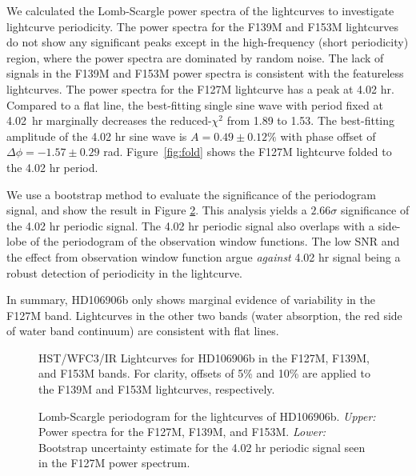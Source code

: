\documentclass[twocolumn]{aastex62}
\begin{document}
We calculated the Lomb-Scargle power spectra \citep[][Figure~\ref{fig:periodogram}]{Lomb1976} of the lightcurves to investigate lightcurve periodicity. The power spectra for the F139M and F153M lightcurves do not show any significant peaks except in the high-frequency (short periodicity) region, where the power spectra are dominated by random noise. The lack of signals in the F139M and F153M power spectra is consistent with the featureless lightcurves. The power spectra for the F127M lightcurve has a peak at 4.02 hr. Compared to a flat line, the best-fitting single sine wave with period fixed at 4.02~hr marginally decreases the reduced-$\chi^{2}$ from 1.89 to 1.53. The best-fitting amplitude of the 4.02 hr sine wave is $A = 0.49\pm0.12\%$ with phase offset of $\Delta \phi = -1.57\pm0.29$ rad. Figure~\ref{fig:fold} shows the F127M lightcurve folded to the 4.02 hr period.

We use a bootstrap method \citep{Manjavacas2017,Zhou2019} to evaluate the significance of the periodogram signal, and show the result in Figure \ref{fig:periodogram}. This analysis yields a $2.66\sigma$ significance of the 4.02 hr periodic signal. The 4.02 hr periodic signal also overlaps with a side-lobe of the periodogram of the observation window functions. The low SNR and the effect from observation window function argue \emph{against} 4.02 hr signal being a robust detection of periodicity in the lightcurve.

In summary, HD106906b only shows marginal  evidence of variability in the F127M band. Lightcurves in the other two bands (water absorption, the red side of water band continuum) are consistent with flat lines.

\begin{figure}[!ht]
  \centering
  \caption{HST/WFC3/IR Lightcurves for HD106906b in the F127M, F139M, and F153M bands. For clarity,  offsets of 5\% and 10\% are applied to the F139M and F153M lightcurves, respectively.}
  \label{fig:lightcurve}
\end{figure}

\begin{figure}[!ht]
  \centering
  \caption{Lomb-Scargle periodogram for the lightcurves of HD106906b. \emph{Upper:} Power spectra for the F127M, F139M, and F153M. \emph{Lower:} Bootstrap uncertainty estimate for the 4.02 hr periodic signal seen in the F127M power spectrum. }
  \label{fig:periodogram}
\end{figure}
\end{document}
